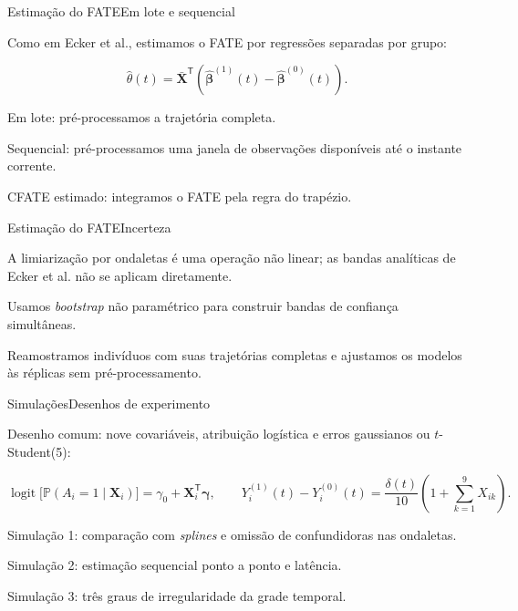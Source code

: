 \documentclass[aspectratio=169,t]{beamer}
\begin{document}
\begin{frame}{Estimação do FATE}{Em lote e sequencial}
\begin{topicos}
\item Como em Ecker et al., estimamos o FATE por regressões separadas por grupo:
\end{topicos}
\vspace{8bp}
{\tamEquacao\[
\hat\theta(t)=\bar{\mathbf X}^{\mathsf T}\!\left(\hat{\boldsymbol\beta}^{(1)}(t)-\hat{\boldsymbol\beta}^{(0)}(t)\right).
\]}
\vspace{8bp}
\begin{topicos}
\item Em lote: pré-processamos a trajetória completa.
\item Sequencial: pré-processamos uma janela de observações disponíveis até o instante corrente.
\item CFATE estimado: integramos o FATE pela regra do trapézio.
\end{topicos}
\end{frame}
\begin{frame}{Estimação do FATE}{Incerteza}
\begin{topicos}
\item A limiarização por ondaletas é uma operação não linear; as bandas analíticas de Ecker et al. não se aplicam diretamente.
\item Usamos \textit{bootstrap} não paramétrico para construir bandas de confiança simultâneas.
\item Reamostramos indivíduos com suas trajetórias completas e ajustamos os modelos às réplicas sem pré-processamento.
\end{topicos}
\end{frame}
\begin{frame}{Simulações}{Desenhos de experimento}
\begin{topicos}
\item Desenho comum: nove covariáveis, atribuição logística e erros gaussianos ou $t$-Student(5):
\end{topicos}
{\tamEquacao\[
\operatorname{logit}\!\bigl[\mathbb P(A_i=1\mid\mathbf X_i)\bigr]
=\gamma_0+\mathbf X_i^{\mathsf T}\boldsymbol\gamma,\qquad
Y_i^{(1)}(t)-Y_i^{(0)}(t)=\frac{\delta(t)}{10}\!\left(1+\sum_{k=1}^{9}X_{ik}\right).
\]}
\begin{topicos}
\item Simulação 1: comparação com \textit{splines} e omissão de confundidoras nas ondaletas.
\item Simulação 2: estimação sequencial ponto a ponto e latência.
\item Simulação 3: três graus de irregularidade da grade temporal.
\end{topicos}
\end{frame}
\end{document}
